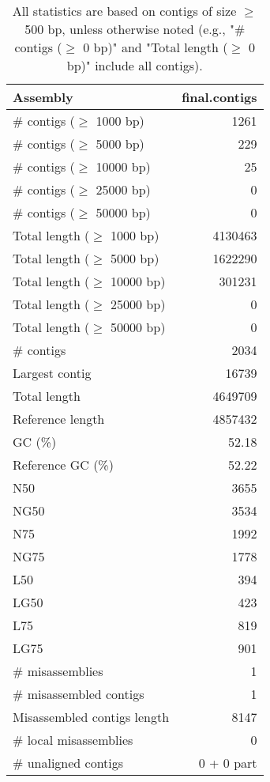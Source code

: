 \documentclass[12pt,a4paper]{article}
\begin{document}
\begin{table}[ht]
\begin{center}
\caption{All statistics are based on contigs of size $\geq$ 500 bp, unless otherwise noted (e.g., "\# contigs ($\geq$ 0 bp)" and "Total length ($\geq$ 0 bp)" include all contigs).}
\begin{tabular}{|l*{1}{|r}|}
\hline
Assembly & final.contigs \\ \hline
\# contigs ($\geq$ 1000 bp) & 1261 \\ \hline
\# contigs ($\geq$ 5000 bp) & 229 \\ \hline
\# contigs ($\geq$ 10000 bp) & 25 \\ \hline
\# contigs ($\geq$ 25000 bp) & 0 \\ \hline
\# contigs ($\geq$ 50000 bp) & 0 \\ \hline
Total length ($\geq$ 1000 bp) & 4130463 \\ \hline
Total length ($\geq$ 5000 bp) & 1622290 \\ \hline
Total length ($\geq$ 10000 bp) & 301231 \\ \hline
Total length ($\geq$ 25000 bp) & 0 \\ \hline
Total length ($\geq$ 50000 bp) & 0 \\ \hline
\# contigs & 2034 \\ \hline
Largest contig & 16739 \\ \hline
Total length & 4649709 \\ \hline
Reference length & 4857432 \\ \hline
GC (\%) & 52.18 \\ \hline
Reference GC (\%) & 52.22 \\ \hline
N50 & 3655 \\ \hline
NG50 & 3534 \\ \hline
N75 & 1992 \\ \hline
NG75 & 1778 \\ \hline
L50 & 394 \\ \hline
LG50 & 423 \\ \hline
L75 & 819 \\ \hline
LG75 & 901 \\ \hline
\# misassemblies & 1 \\ \hline
\# misassembled contigs & 1 \\ \hline
Misassembled contigs length & 8147 \\ \hline
\# local misassemblies & 0 \\ \hline
\# unaligned contigs & 0 + 0 part \\ \hline

\end{tabular}
\end{center}
\end{table}
\end{document}
